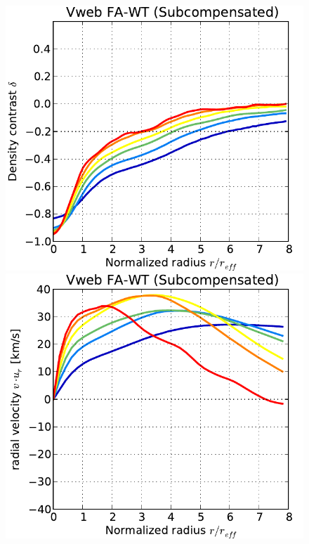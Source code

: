 \documentclass[a4,useAMS,usenatbib,usegraphicx]{mn2e}
\begin{document}
\begin{figure}
  \includegraphics[trim = 1mm 0mm 5mm 0mm, clip, keepaspectratio=true,
  width=0.24\textheight]{voids_density_VwebFAG0.pdf}
  \includegraphics[trim = 1mm 0mm 5mm 0mm, clip, keepaspectratio=true,
  width=0.24\textheight]{voids_velocity_VwebFAG0.pdf}

\end{figure}
\end{document}
